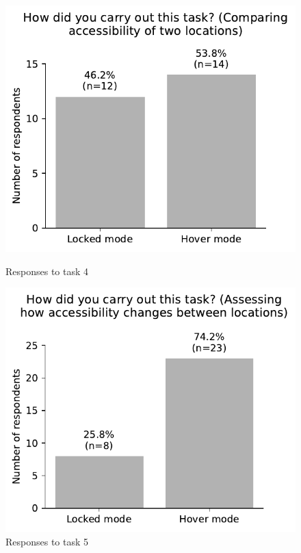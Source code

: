 \begin{appendices}
\begin{figure}[H]
	\centering
	\begin{minipage}{0.5\textwidth}
		\centering
		\includegraphics[width=\textwidth]{visual/figures/survey/5.pdf}
		\caption{Responses to task 4}
		\label{fig:task 4}
	\end{minipage}%
	\begin{minipage}{0.5\textwidth}
		\centering
		\includegraphics[width=\textwidth]{visual/figures/survey/6.pdf}
		\caption{Responses to task 5}
		\label{fig:task 5}
	\end{minipage}
\end{figure}


\end{appendices}
